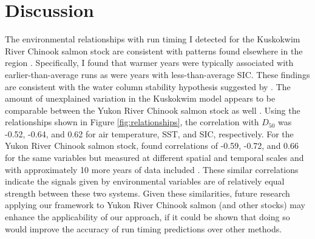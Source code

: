 \documentclass[12pt,]{book}
\theoremstyle{definition}
\theoremstyle{definition}
\theoremstyle{definition}
\theoremstyle{remark}
\begin{document}
\section{Discussion}\label{discussion}

The environmental relationships with run timing I detected for the
Kuskokwim River Chinook salmon stock are consistent with patterns found
elsewhere in the region
\citep[e.g.,][]{mundy-evenson-2011, hodgson-etal-2006}. Specifically, I
found that warmer years were typically associated with
earlier-than-average runs as were years with less-than-average SIC.
These findings are consistent with the water column stability hypothesis
suggested by \citet{mundy-evenson-2011}. The amount of unexplained
variation in the Kuskokwim model appears to be comparable between the
Yukon River Chinook salmon stock as well \citep{mundy-evenson-2011}.
Using the relationships shown in Figure \ref{fig:relationships}, the
correlation with \(D_{50}\) was -0.52, -0.64, and 0.62 for air
temperature, SST, and SIC, respectively. For the Yukon River Chinook
salmon stock, \citet{mundy-evenson-2011} found correlations of -0.59,
-0.72, and 0.66 for the same variables but measured at different spatial
and temporal scales and with approximately 10 more years of data
included \citep[Table 2 in][]{mundy-evenson-2011}. These similar
correlations indicate the signals given by environmental variables are
of relatively equal strength between these two systems. Given these
similarities, future research applying our framework to Yukon River
Chinook salmon (and other stocks) may enhance the applicability of our
approach, if it could be shown that doing so would improve the accuracy
of run timing predictions over other methods.
\end{document}
